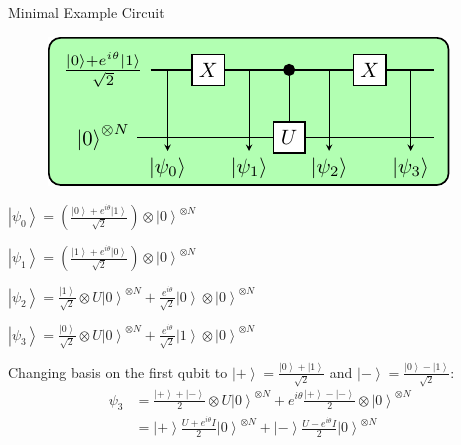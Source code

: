 \documentclass[professionalfonts]{beamer}
\newcommand{\ket}[1]{\ensuremath{\left|#1\right\rangle}}
\newcommand{\paren}[1]{\left( #1 \right)}
\newcommand{\elec}{N}
\begin{document}
\begin{frame}{Minimal Example Circuit}
\begin{overlayarea}{\textwidth}{\textheight}
{
\begin{figure}[ht!]
  \includegraphics[width=.75\linewidth]{../circuits/circuit1}
\end{figure}
}

\begin{itemize}
{
	\item \(
		\ket{\psi_0} 
		= \paren{\frac{\ket 0 + e^{i\theta}\ket 1}{\sqrt 2}}\otimes \ket 0^{\otimes\elec}
		\)
	\item \(
		\ket{\psi_1}
		= \paren{\frac{\ket 1 + e^{i\theta}\ket 0}{\sqrt 2}}\otimes \ket 0^{\otimes\elec} 
		\)
	\item \(
		\ket{\psi_2}
		= \frac{\ket 1}{\sqrt 2} \otimes U \ket 0^{\otimes\elec} + \frac{e^{i\theta}}{\sqrt 2}\ket 0 \otimes \ket 0^{\otimes\elec} 
		\)
  }
	{
	\item \(
		\ket{\psi_3}
		= \frac{\ket 0}{\sqrt 2} \otimes U \ket 0^{\otimes\elec} + \frac{e^{i\theta}}{\sqrt 2}\ket 1 \otimes \ket 0^{\otimes\elec} 
		\)
	}

	{
			Changing basis on the first qubit to 
			$\ket + = \frac{\ket 0 + \ket 1}{\sqrt 2}$
			and
			$\ket - = \frac{\ket 0 - \ket 1}{\sqrt 2}$:
			\begin{equation*}
				\begin{split}
					\psi_3
					&= \frac{\ket + + \ket -}{2} \otimes U \ket 0^{\otimes\elec} + e^{i\theta}\frac{\ket + - \ket -}{2} \otimes \ket 0^{\otimes\elec} \\
					&= \ket + \frac{U + e^{i\theta}I}{2}\ket 0^{\otimes\elec}
					+ \ket - \frac{U - e^{i\theta}I}{2}\ket 0^{\otimes\elec}
				\end{split}
			\end{equation*}
	}
\end{itemize}
\end{overlayarea}
\end{frame}

\end{document}
